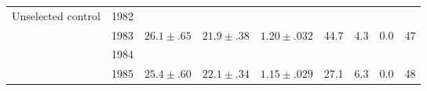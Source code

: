 \begin{landscape}
\begin{table}
\begin{tabular}{l|r|rrr|rrr|r}
Unselected control    & 1982   &            &           &            &       &      &     &     \\
                      & 1983   &  $26.1\pm.65$ & $21.9\pm.38$  & $1.20\pm.032$ &  44.7 &  4.3 & 0.0 &  47 \\
                      & 1984   &            &           &            &       &      &     &     \\
                      & 1985   &  $25.4\pm.60$ & $22.1\pm.34$  & $1.15\pm.029$ &  27.1 &  6.3 & 0.0 &  48 \\ \hline
  
\end{tabular}
\end{table}
\end{landscape}

%

